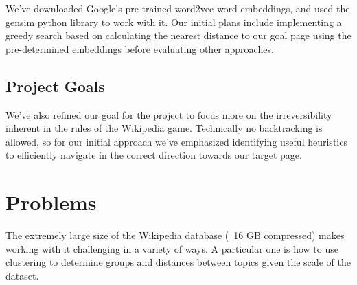 \documentclass[11pt]{article}
\begin{document}
We've downloaded Google's pre-trained word2vec word embeddings, and used the gensim python library to work with it. Our initial plans include implementing a greedy search based on calculating the nearest distance to our goal page using the pre-determined embeddings before evaluating other approaches.

\subsection{Project Goals}

We've also refined our goal for the project to focus more on the irreversibility inherent in the rules of the Wikipedia game. Technically no backtracking is allowed, so for our initial approach we've emphasized identifying useful heuristics to efficiently navigate in the correct direction towards our target page.

\section{Problems}

The extremely large size of the Wikipedia database (~16 GB compressed) makes working with it challenging in a variety of ways. A particular one is how to use clustering to determine groups and distances between topics given the scale of the dataset.
\end{document}
